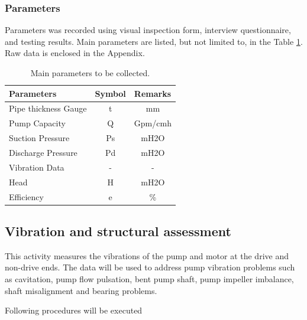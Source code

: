 \subsubsection{Parameters}
Parameters was recorded using visual inspection form, interview questionnaire, and testing results. Main parameters are listed, but not limited to, in the Table \ref{ch02_tbl_parameter}. Raw data is enclosed in the Appendix.

\begin{table}[h]
	\caption{Main parameters to be collected.}
	\label{ch02_tbl_parameter}
	{\footnotesize
\begin{tabular}{l|l|l}
	\hline
	Parameters & \multicolumn{1}{c|}{Symbol} & Remarks \\ 
	\hline
	Pipe thickness Gauge & \multicolumn{1}{c|}{t} & \multicolumn{1}{c}{mm} \\ 
	Pump Capacity & \multicolumn{1}{c|}{Q} & \multicolumn{1}{c}{Gpm/cmh} \\ 
	Suction Pressure  & \multicolumn{1}{c|}{Ps} & \multicolumn{1}{c}{mH2O} \\ 
	Discharge Pressure & \multicolumn{1}{c|}{Pd} & \multicolumn{1}{c}{mH2O} \\ 
	Vibration Data  & \multicolumn{1}{c|}{-} & \multicolumn{1}{c}{-} \\ 
	Head & \multicolumn{1}{c|}{H} & \multicolumn{1}{c}{mH2O} \\ 
	Efficiency  & \multicolumn{1}{c|}{e} & \multicolumn{1}{c}{\%} \\ 
		\hline
	\end{tabular}		
	}
\end{table}


%

\subsection{Vibration and structural assessment}
\label{235}
This activity measures the vibrations of the pump and motor at the drive and non-drive ends. The data will be used to address pump vibration problems such as cavitation, pump flow pulsation, bent pump shaft, pump impeller imbalance, shaft misalignment and bearing problems.

Following procedures will be executed

